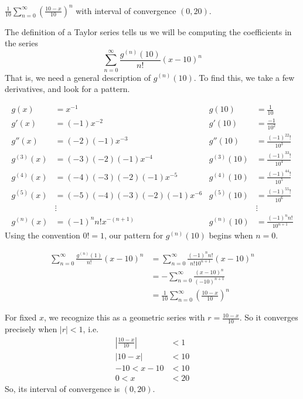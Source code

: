 \begin{answer}
$\displaystyle\frac{1}{10}\sum_{n=0}^\infty\left(\frac{10-x}{10}\right)^n$ with interval of convergence $(0,20)$.
\end{answer}
\begin{solution}
The definition of a Taylor series tells us we will be computing the coefficients in the series
\[\sum_{n=0}^\infty \frac{g^{(n)}(10)}{n!}(x-10)^n\]
That is, we need a general description of $g^{(n)}(10)$. To find this, we take a few derivatives, and look for a pattern.

\begin{align*}
g(x)&=x^{-1} & g(10)&=\frac{1}{10}\\
g'(x)&=(-1)x^{-2} & g'(10)&=\frac{-1}{10^2}\\
g''(x)&=(-2)(-1)x^{-3}& g''(10)&=\frac{(-1)^22!}{10^3}\\
g^{(3)}(x)&=(-3)(-2)(-1)x^{-4}& g^{(3)}(10)&=\frac{(-1)^33!}{10^4}\\
g^{(4)}(x)&=(-4)(-3)(-2)(-1)x^{-5}&g^{(4)}(10)&=\frac{(-1)^44!}{10^5}\\
g^{(5)}(x)&=(-5)(-4)(-3)(-2)(-1)x^{-6}& g^{(5)}(10)&=\frac{(-1)^55!}{10^6}\\
&\vdots&&\vdots\\
g^{(n)}(x)&=(-1)^{n}n!x^{-(n+1)} & g^{(n)}(10)&=\frac{(-1)^{n}n!}{10^{n+1}}
\end{align*}
Using the convention $0!=1$, our pattern for $g^{(n)}(10)$ begins when $n=0$.

\begin{align*}
\sum_{n=0}^\infty \frac{g^{(n)}(1)}{n!}(x-10)^n
&=\sum_{n=0}^\infty \frac{(-1)^{n}n!}{n! 10^{n+1}}(x-10)^n\\
&=-\sum_{n=0}^\infty \frac{(x-10)^n}{(-10)^{n+1}}\\
&=\frac{1}{10}\sum_{n=0}^\infty\left(\frac{10-x}{10}\right)^n
\end{align*}

For fixed $x$, we recognize this as a geometric series with $r=\frac{10-x}{10}$. So it converges precisely when $|r|<1$, i.e.
\begin{align*}
\left| \frac{10-x}{10} \right|&<1\\
\left|10-x \right|&<10\\
-10<x-10&<10\\
0<x&<20
\end{align*}
So, its interval of convergence is $(0,20)$.
\end{solution}


